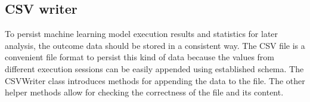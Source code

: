 \subsection{CSV writer}\label{subsec:csv-writer}
To persist machine learning model execution results and statistics for later analysis, the outcome data should be stored in a consistent way.
The CSV file is a convenient file format to persist this kind of data because the values from different execution sessions can be easily appended using established schema.
The CSVWriter class introduces methods for appending the data to the file.
The other helper methods allow for checking the correctness of the file and its content.
